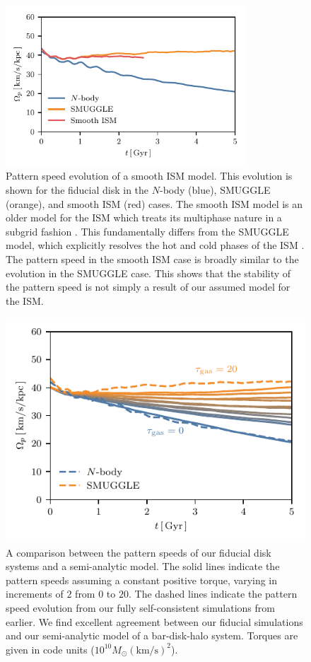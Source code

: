 \documentclass[fleqn,usenatbib]{mnras}
\newcommand{\kms}{\ensuremath{\textrm{km}/\textrm{s}}}
\newcommand{\Nbody}{$N$-body}
\newcommand{\Msun}{\ensuremath{M_{\odot}}}
\begin{document}
\begin{figure}
    \centering
    \includegraphics[width=9cm]{fig/ps_GFM.pdf}
    \caption{Pattern speed evolution of a smooth ISM model. This evolution is
    shown for the fiducial disk in the \Nbody{} (blue), SMUGGLE (orange), and
    smooth ISM (red) cases. The smooth ISM model is an older model for the ISM
    which treats its multiphase nature in a subgrid fashion
    \citep{2003MNRAS.339..289S}. This fundamentally differs from the SMUGGLE
    model, which explicitly resolves the hot and cold phases of the ISM
    \citep{2019MNRAS.489.4233M}. The pattern speed in the smooth ISM case is
    broadly similar to the evolution in the SMUGGLE case. This shows that the
    stability of the pattern speed is not simply a result of our assumed model
    for the ISM.}
\label{fig:GFM}
\end{figure}

\begin{figure}
    \centering
    \includegraphics[width=\columnwidth]{fig/samGvar.pdf}
    \caption{A comparison between the pattern speeds of our fiducial disk
    systems and a semi-analytic model. The solid lines indicate the pattern
    speeds assuming a constant positive torque, varying in increments of $2$
    from $0$ to $20$. The dashed lines indicate the pattern speed evolution from
    our fully self-consistent simulations from earlier. We find excellent
    agreement between our fiducial simulations and our semi-analytic model of a
    bar-disk-halo system. Torques are given in code units ($10^{10}\Msun
    \left(\kms\right)^2$).}
    \label{fig:sam}
\end{figure}
\end{document}
